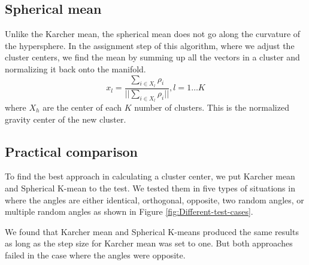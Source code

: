 \documentclass[../tech_report_1.tex]{subfiles}
\begin{document}
\subsection{Spherical mean}

Unlike the Karcher mean, the spherical mean does not go along the
curvature of the hypersphere. In the assignment step of this algorithm,
where we adjust the cluster centers, we find the mean by summing up
all the vectors in a cluster and normalizing it back onto the manifold.
\[
x_{l}=\frac{\sum_{i\in X_{l}}\rho_{i}}{||\sum_{i\in X_{l}}\rho_{i}||},l=1\dots K
\]
 where $X_{h}$ are the center of each $K$ number of clusters. This
is the normalized gravity center of the new cluster. 


\subsection{Practical comparison}

To find the best approach in calculating a cluster center, we put
Karcher mean and Spherical K-mean to the test. We tested them in five
types of situations in where the angles are either identical, orthogonal,
opposite, two random angles, or multiple random angles as shown in
Figure \ref{fig:Different-test-cases}. 

We found that Karcher mean and Spherical K-means produced the same
results as long as the step size for Karcher mean was set to one.
But both approaches failed in the case where the angles were opposite. 

\end{document}
